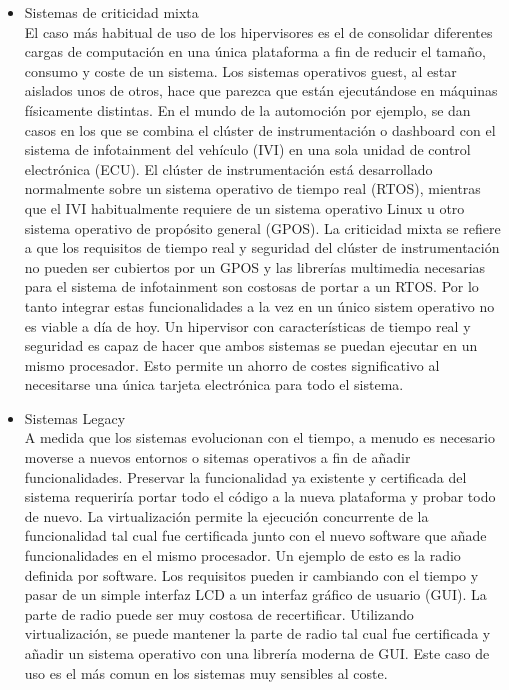 \begin{itemize}
	\item Sistemas de criticidad mixta\\
	El caso más habitual de uso de los hipervisores es el de consolidar diferentes cargas de computación en una única
	plataforma a fin de reducir el tamaño, consumo y coste de un sistema. Los sistemas operativos guest, al estar aislados unos de otros, hace que parezca que están ejecutándose en máquinas físicamente distintas. En el mundo de la automoción por ejemplo,
	se dan casos en los que se combina el clúster de instrumentación o dashboard con el sistema de infotainment del vehículo (IVI) en una sola unidad de control electrónica (ECU). El clúster de instrumentación está desarrollado normalmente sobre un sistema operativo de tiempo real (RTOS), mientras que el IVI habitualmente requiere de un sistema operativo Linux u otro sistema operativo de propósito general (GPOS). La criticidad mixta se refiere a que los requisitos de tiempo real y seguridad del clúster de instrumentación no pueden ser cubiertos por un GPOS y las librerías multimedia necesarias para el sistema de infotainment son costosas de portar a un RTOS. Por lo tanto integrar estas funcionalidades a la vez en un único sistem operativo no es viable a día de hoy. Un hipervisor con características de tiempo real y seguridad es capaz de hacer que ambos sistemas se puedan ejecutar en un mismo procesador. Esto permite un ahorro de costes significativo al necesitarse una única tarjeta electrónica para todo el sistema.
	\item Sistemas Legacy\\
	A medida que los sistemas evolucionan con el tiempo, a menudo es necesario moverse a nuevos entornos o sitemas operativos a fin de añadir funcionalidades. Preservar la funcionalidad ya existente y certificada del sistema requeriría portar todo el código a la nueva plataforma y probar todo de nuevo. La virtualización permite la ejecución concurrente de la funcionalidad tal cual fue certificada junto con el nuevo software que añade funcionalidades en el mismo procesador. Un ejemplo de esto es la radio definida por software. Los requisitos pueden ir cambiando con el tiempo y pasar de un simple interfaz LCD a un interfaz gráfico de usuario (GUI). La parte de radio puede ser muy costosa de recertificar. Utilizando virtualización, se puede mantener la parte de radio tal cual fue certificada y añadir un sistema operativo con una librería moderna de GUI.
	Este caso de uso es el más comun en los sistemas muy sensibles al coste.\\[1cm]
\end{itemize}
